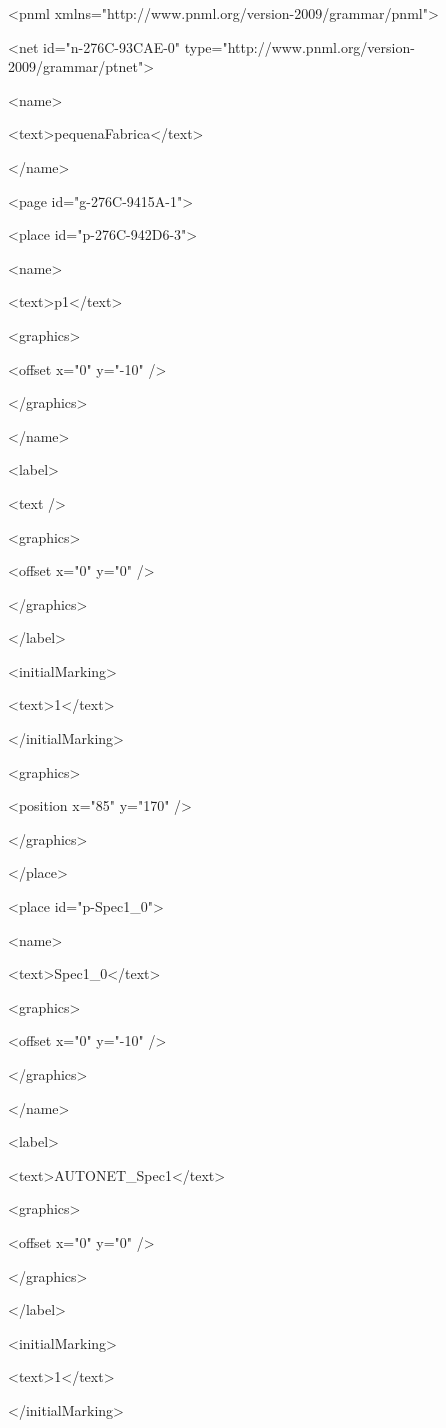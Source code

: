 <pnml xmlns="http://www.pnml.org/version-2009/grammar/pnml">

 <net id="n-276C-93CAE-0" type="http://www.pnml.org/version-2009/grammar/ptnet">

  <name>

   <text>pequenaFabrica</text>

  </name>

  <page id="g-276C-9415A-1">

   <place id="p-276C-942D6-3">

    <name>

     <text>p1</text>

     <graphics>

      <offset x="0" y="-10" />

     </graphics>

    </name>

    <label>

     <text />

     <graphics>

      <offset x="0" y="0" />

     </graphics>

    </label>

    <initialMarking>

     <text>1</text>

    </initialMarking>

    <graphics>

     <position x="85" y="170" />

    </graphics>

   </place>

   <place id="p-Spec1\_0">

    <name>

     <text>Spec1\_0</text>

     <graphics>

      <offset x="0" y="-10" />

     </graphics>

    </name>

    <label>

     <text>AUTONET\_Spec1</text>

     <graphics>

      <offset x="0" y="0" />

     </graphics>

    </label>

    <initialMarking>

     <text>1</text>

    </initialMarking>

